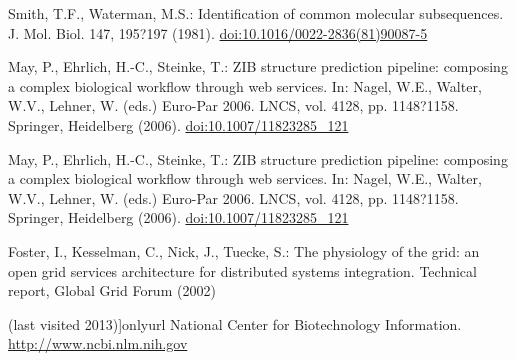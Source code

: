 %
%
Smith, T.F., Waterman, M.S.: Identification of common molecular subsequences.
J. Mol. Biol. 147, 195?197 (1981). \url{doi:10.1016/0022-2836(81)90087-5}

May, P., Ehrlich, H.-C., Steinke, T.: ZIB structure prediction pipeline:
composing a complex biological workflow through web services.
In: Nagel, W.E., Walter, W.V., Lehner, W. (eds.) Euro-Par 2006.
LNCS, vol. 4128, pp. 1148?1158. Springer, Heidelberg (2006).
\url{doi:10.1007/11823285_121}

May, P., Ehrlich, H.-C., Steinke, T.: ZIB structure prediction pipeline:
composing a complex biological workflow through web services.
In: Nagel, W.E., Walter, W.V., Lehner, W. (eds.) Euro-Par 2006.
LNCS, vol. 4128, pp. 1148?1158. Springer, Heidelberg (2006).
\url{doi:10.1007/11823285_121}


Foster, I., Kesselman, C., Nick, J., Tuecke, S.: The physiology of the grid: an open grid services architecture for distributed systems integration. Technical report, Global Grid
Forum (2002)

\bibitem [5](last visited 2013)]{onlyurl}
National Center for Biotechnology Information. \url{http://www.ncbi.nlm.nih.gov}
